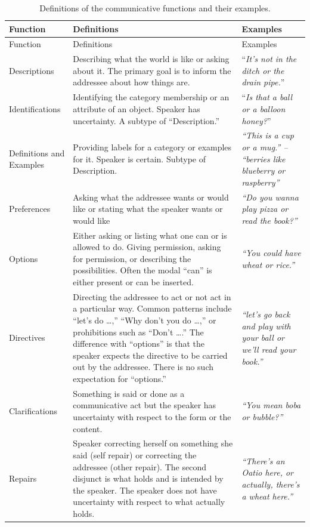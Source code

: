 \documentclass[
  english,
  ,man,floatsintext]{apa6}
\begin{document}
\begin{longtable}[]{@{}
  >{\raggedright\arraybackslash}p{}
  >{\raggedright\arraybackslash}p{}
  >{\raggedright\arraybackslash}p{}@{}}
\caption{\label{tab:speechActs} Definitions of the communicative functions and their examples.}\tabularnewline
\toprule
Function & Definitions & Examples \\
\midrule
\endfirsthead
\toprule
Function & Definitions & Examples \\
\midrule
\endhead
Descriptions & Describing what the world is like or asking about it. The primary goal is to inform the addressee about how things are. & ``\emph{It's not in the ditch or the drain pipe.}'' \\
Identifications & Identifying the category membership or an attribute of an object. Speaker has uncertainty. A subtype of ``Description.'' & ``\emph{Is that a ball or a balloon honey?}'' \\
Definitions and Examples & Providing labels for a category or examples for it. Speaker is certain. Subtype of Description. & \emph{``This is a cup or a mug.'' -- ``berries like blueberry or raspberry''} \\
Preferences & Asking what the addressee wants or would like or stating what the speaker wants or would like & \emph{``Do you wanna play pizza or read the book?''} \\
Options & Either asking or listing what one can or is allowed to do. Giving permission, asking for permission, or describing the possibilities. Often the modal ``can'' is either present or can be inserted. & \emph{``You could have wheat or rice.''} \\
Directives & Directing the addressee to act or not act in a particular way. Common patterns include ``let's do \ldots{},'' ``Why don't you do \ldots{},'' or prohibitions such as ``Don't \ldots{}.'' The difference with ``options'' is that the speaker expects the directive to be carried out by the addressee. There is no such expectation for ``options.'' & \emph{``let's go back and play with your ball or we'll read your book.''} \\
Clarifications & Something is said or done as a communicative act but the speaker has uncertainty with respect to the form or the content. & \emph{``You mean boba or bubble?''} \\
Repairs & Speaker correcting herself on something she said (self repair) or correcting the addressee (other repair). The second disjunct is what holds and is intended by the speaker. The speaker does not have uncertainty with respect to what actually holds. & \emph{``There's an Oatio here, or actually, there's a wheat here.''} \\

\end{longtable}
\end{document}
